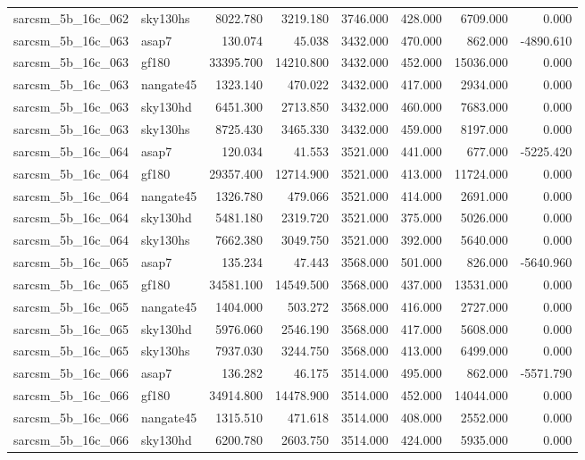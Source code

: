 \begin{tabular}{llrrrrrr}
sarcsm\_5b\_16c\_062 & sky130hs & 8022.780 & 3219.180 & 3746.000 & 428.000 & 6709.000 & 0.000 \\
sarcsm\_5b\_16c\_063 & asap7 & 130.074 & 45.038 & 3432.000 & 470.000 & 862.000 & -4890.610 \\
sarcsm\_5b\_16c\_063 & gf180 & 33395.700 & 14210.800 & 3432.000 & 452.000 & 15036.000 & 0.000 \\
sarcsm\_5b\_16c\_063 & nangate45 & 1323.140 & 470.022 & 3432.000 & 417.000 & 2934.000 & 0.000 \\
sarcsm\_5b\_16c\_063 & sky130hd & 6451.300 & 2713.850 & 3432.000 & 460.000 & 7683.000 & 0.000 \\
sarcsm\_5b\_16c\_063 & sky130hs & 8725.430 & 3465.330 & 3432.000 & 459.000 & 8197.000 & 0.000 \\
sarcsm\_5b\_16c\_064 & asap7 & 120.034 & 41.553 & 3521.000 & 441.000 & 677.000 & -5225.420 \\
sarcsm\_5b\_16c\_064 & gf180 & 29357.400 & 12714.900 & 3521.000 & 413.000 & 11724.000 & 0.000 \\
sarcsm\_5b\_16c\_064 & nangate45 & 1326.780 & 479.066 & 3521.000 & 414.000 & 2691.000 & 0.000 \\
sarcsm\_5b\_16c\_064 & sky130hd & 5481.180 & 2319.720 & 3521.000 & 375.000 & 5026.000 & 0.000 \\
sarcsm\_5b\_16c\_064 & sky130hs & 7662.380 & 3049.750 & 3521.000 & 392.000 & 5640.000 & 0.000 \\
sarcsm\_5b\_16c\_065 & asap7 & 135.234 & 47.443 & 3568.000 & 501.000 & 826.000 & -5640.960 \\
sarcsm\_5b\_16c\_065 & gf180 & 34581.100 & 14549.500 & 3568.000 & 437.000 & 13531.000 & 0.000 \\
sarcsm\_5b\_16c\_065 & nangate45 & 1404.000 & 503.272 & 3568.000 & 416.000 & 2727.000 & 0.000 \\
sarcsm\_5b\_16c\_065 & sky130hd & 5976.060 & 2546.190 & 3568.000 & 417.000 & 5608.000 & 0.000 \\
sarcsm\_5b\_16c\_065 & sky130hs & 7937.030 & 3244.750 & 3568.000 & 413.000 & 6499.000 & 0.000 \\
sarcsm\_5b\_16c\_066 & asap7 & 136.282 & 46.175 & 3514.000 & 495.000 & 862.000 & -5571.790 \\
sarcsm\_5b\_16c\_066 & gf180 & 34914.800 & 14478.900 & 3514.000 & 452.000 & 14044.000 & 0.000 \\
sarcsm\_5b\_16c\_066 & nangate45 & 1315.510 & 471.618 & 3514.000 & 408.000 & 2552.000 & 0.000 \\
sarcsm\_5b\_16c\_066 & sky130hd & 6200.780 & 2603.750 & 3514.000 & 424.000 & 5935.000 & 0.000 \\

\end{tabular}
